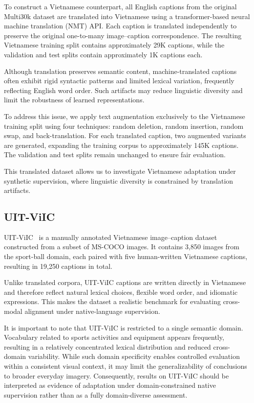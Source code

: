 To construct a Vietnamese counterpart, all English captions from the original Multi30k dataset are translated into Vietnamese using a transformer-based neural machine translation (NMT) API\cite{google_translate_api}. Each caption is translated independently to preserve the original one-to-many image–caption correspondence. The resulting Vietnamese training split contains approximately 29K captions, while the validation and test splits contain approximately 1K captions each.

Although translation preserves semantic content, machine-translated captions often exhibit rigid syntactic patterns and limited lexical variation, frequently reflecting English word order. Such artifacts may reduce linguistic diversity and limit the robustness of learned representations.

To address this issue, we apply text augmentation exclusively to the Vietnamese training split using four techniques: random deletion, random insertion, random swap, and back-translation. For each translated caption, two augmented variants are generated, expanding the training corpus to approximately 145K captions. The validation and test splits remain unchanged to ensure fair evaluation.

This translated dataset allows us to investigate Vietnamese adaptation under synthetic supervision, where linguistic diversity is constrained by translation artifacts.


\subsection{UIT-ViIC}

UIT-ViIC~\cite{lam2020uitviicdatasetevaluationvietnamese} is a manually annotated Vietnamese image--caption dataset constructed from a subset of MS-COCO images. It contains 3{,}850 images from the sport-ball domain, each paired with five human-written Vietnamese captions, resulting in 19{,}250 captions in total.

Unlike translated corpora, UIT-ViIC captions are written directly in Vietnamese and therefore reflect natural lexical choices, flexible word order, and idiomatic expressions. This makes the dataset a realistic benchmark for evaluating cross-modal alignment under native-language supervision.

It is important to note that UIT-ViIC is restricted to a single semantic domain. Vocabulary related to sports activities and equipment appears frequently, resulting in a relatively concentrated lexical distribution and reduced cross-domain variability. While such domain specificity enables controlled evaluation within a consistent visual context, it may limit the generalizability of conclusions to broader everyday imagery. Consequently, results on UIT-ViIC should be interpreted as evidence of adaptation under domain-constrained native supervision rather than as a fully domain-diverse assessment.

